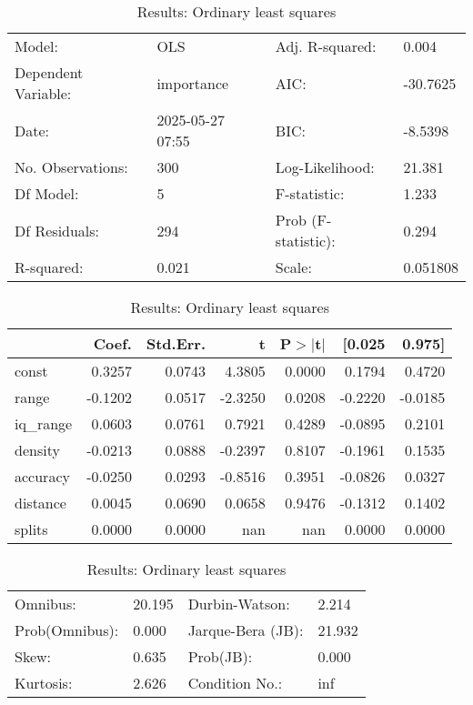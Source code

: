 \begin{table}
\caption{Results: Ordinary least squares}
\label{}
\begin{center}
\begin{tabular}{llll}
\hline
Model:              & OLS              & Adj. R-squared:     & 0.004     \\
Dependent Variable: & importance       & AIC:                & -30.7625  \\
Date:               & 2025-05-27 07:55 & BIC:                & -8.5398   \\
No. Observations:   & 300              & Log-Likelihood:     & 21.381    \\
Df Model:           & 5                & F-statistic:        & 1.233     \\
Df Residuals:       & 294              & Prob (F-statistic): & 0.294     \\
R-squared:          & 0.021            & Scale:              & 0.051808  \\
\hline
\end{tabular}
\end{center}

\begin{center}
\begin{tabular}{lrrrrrr}
\hline
          &   Coef. & Std.Err. &       t & P$> |$t$|$ &  [0.025 &  0.975]  \\
\hline
const     &  0.3257 &   0.0743 &  4.3805 &      0.0000 &  0.1794 &  0.4720  \\
range     & -0.1202 &   0.0517 & -2.3250 &      0.0208 & -0.2220 & -0.0185  \\
iq\_range &  0.0603 &   0.0761 &  0.7921 &      0.4289 & -0.0895 &  0.2101  \\
density   & -0.0213 &   0.0888 & -0.2397 &      0.8107 & -0.1961 &  0.1535  \\
accuracy  & -0.0250 &   0.0293 & -0.8516 &      0.3951 & -0.0826 &  0.0327  \\
distance  &  0.0045 &   0.0690 &  0.0658 &      0.9476 & -0.1312 &  0.1402  \\
splits    &  0.0000 &   0.0000 &     nan &         nan &  0.0000 &  0.0000  \\
\hline
\end{tabular}
\end{center}

\begin{center}
\begin{tabular}{llll}
\hline
Omnibus:       & 20.195 & Durbin-Watson:    & 2.214   \\
Prob(Omnibus): & 0.000  & Jarque-Bera (JB): & 21.932  \\
Skew:          & 0.635  & Prob(JB):         & 0.000   \\
Kurtosis:      & 2.626  & Condition No.:    & inf     \\
\hline
\end{tabular}
\end{center}
\end{table}
